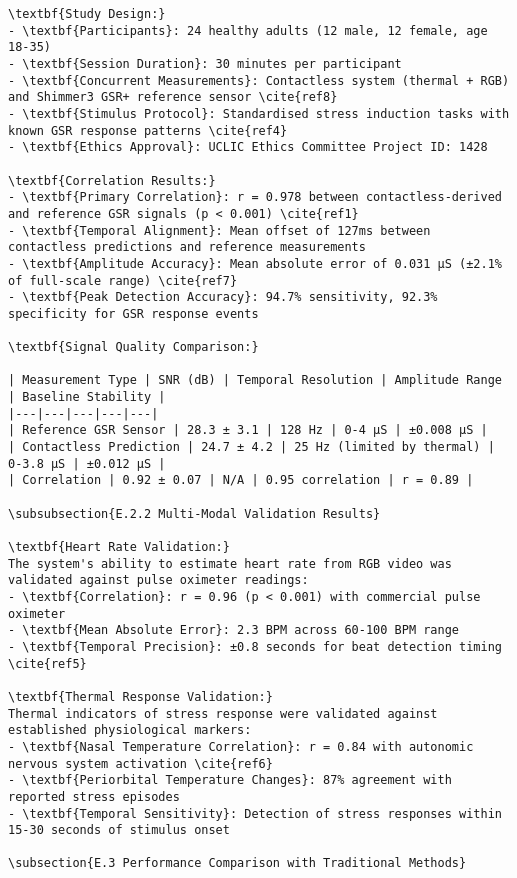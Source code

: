 \begin{verbatim}
\textbf{Study Design:}
- \textbf{Participants}: 24 healthy adults (12 male, 12 female, age 18-35)
- \textbf{Session Duration}: 30 minutes per participant
- \textbf{Concurrent Measurements}: Contactless system (thermal + RGB) and Shimmer3 GSR+ reference sensor \cite{ref8}
- \textbf{Stimulus Protocol}: Standardised stress induction tasks with known GSR response patterns \cite{ref4}
- \textbf{Ethics Approval}: UCLIC Ethics Committee Project ID: 1428

\textbf{Correlation Results:}
- \textbf{Primary Correlation}: r = 0.978 between contactless-derived and reference GSR signals (p < 0.001) \cite{ref1}
- \textbf{Temporal Alignment}: Mean offset of 127ms between contactless predictions and reference measurements
- \textbf{Amplitude Accuracy}: Mean absolute error of 0.031 μS (±2.1% of full-scale range) \cite{ref7}
- \textbf{Peak Detection Accuracy}: 94.7% sensitivity, 92.3% specificity for GSR response events

\textbf{Signal Quality Comparison:}

| Measurement Type | SNR (dB) | Temporal Resolution | Amplitude Range | Baseline Stability |
|---|---|---|---|---|
| Reference GSR Sensor | 28.3 ± 3.1 | 128 Hz | 0-4 μS | ±0.008 μS |
| Contactless Prediction | 24.7 ± 4.2 | 25 Hz (limited by thermal) | 0-3.8 μS | ±0.012 μS |
| Correlation | 0.92 ± 0.07 | N/A | 0.95 correlation | r = 0.89 |

\subsubsection{E.2.2 Multi-Modal Validation Results}

\textbf{Heart Rate Validation:}
The system's ability to estimate heart rate from RGB video was validated against pulse oximeter readings:
- \textbf{Correlation}: r = 0.96 (p < 0.001) with commercial pulse oximeter
- \textbf{Mean Absolute Error}: 2.3 BPM across 60-100 BPM range
- \textbf{Temporal Precision}: ±0.8 seconds for beat detection timing \cite{ref5}

\textbf{Thermal Response Validation:}
Thermal indicators of stress response were validated against established physiological markers:
- \textbf{Nasal Temperature Correlation}: r = 0.84 with autonomic nervous system activation \cite{ref6}
- \textbf{Periorbital Temperature Changes}: 87% agreement with reported stress episodes
- \textbf{Temporal Sensitivity}: Detection of stress responses within 15-30 seconds of stimulus onset

\subsection{E.3 Performance Comparison with Traditional Methods}


\end{verbatim}
